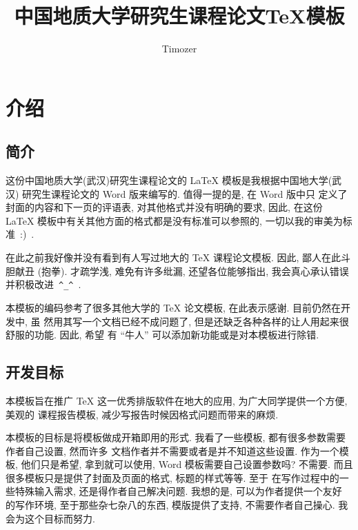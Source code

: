 \documentclass{cugrep}
\title{中国地质大学研究生课程论文\TeX{}模板}
\author{Timozer}
\begin{document}
\maketitle

\frontmatter
{}
\makeabstract 

\tableofcontents
\listoffigures
\listoftables
\clearpage

\mainmatter
\chapter{介绍}
\section{简介}
这份中国地质大学(武汉)研究生课程论文的 \LaTeX{} 模板是我根据中国地大学(武汉)
研究生课程论文的 {\sc Word} 版来编写的. 值得一提的是, 在 {\sc Word} 版中只
定义了封面的内容和下一页的评语表, 对其他格式并没有明确的要求, 因此, 在这份 \LaTeX{} 
模板中有关其他方面的格式都是没有标准可以参照的, 一切以我的审美为标准~:)~.

在此之前我好像并没有看到有人写过地大的 \TeX{} 课程论文模板. 因此, 鄙人在此斗胆献丑 (抱拳). 
才疏学浅, 难免有许多纰漏, 还望各位能够指出, 我会真心承认错误并积极改进~\verb|^_^|~.

本模板的编码参考了很多其他大学的 \TeX{} 论文模板, 在此表示感谢. 目前仍然在开发中, 虽
然用其写一个文档已经不成问题了, 但是还缺乏各种各样的让人用起来很舒服的功能. 因此, 希望
有 ``牛人'' 可以添加新功能或是对本模板进行除错.

\section{开发目标}
本模板旨在推广 \TeX{} 这一优秀排版软件在地大的应用, 为广大同学提供一个方便, 美观的
课程报告模板, 减少写报告时候因格式问题而带来的麻烦. 

本模板的目标是将模板做成开箱即用的形式. 我看了一些模板, 都有很多参数需要作者自己设置, 然而许多
文档作者并不需要或者是并不知道这些设置. 作为一个模板, 他们只是希望, 拿到就可以使用, {\sc Word}
模板需要自己设置参数吗? 不需要. 而且很多模板只是提供了封面及页面的格式, 标题的样式等等. 至于
在写作过程中的一些特殊输入需求, 还是得作者自己解决问题. 我想的是, 可以为作者提供一个友好
的写作环境, 至于那些杂七杂八的东西, 模版提供了支持, 不需要作者自己操心. 我会为这个目标而努力.
\end{document}
